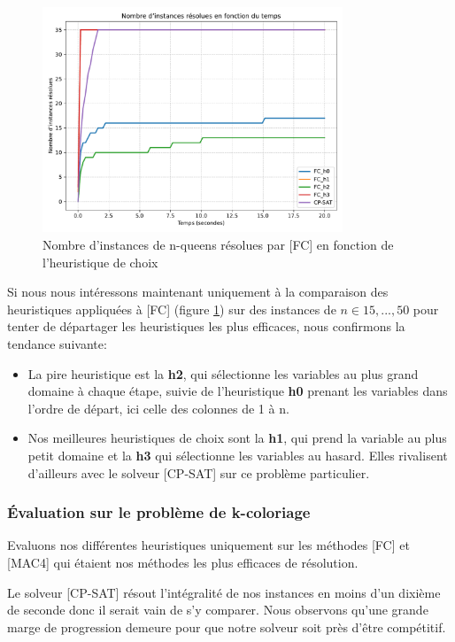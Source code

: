 \documentclass[14pt]{article}
\begin{document}
\begin{figure}[H]
	\centering
	\includegraphics[width=0.8\textwidth]{Images/n-queens-h-FC.pdf}
	\caption{Nombre d'instances de n-queens résolues par [FC] en fonction de l'heuristique de choix}
	\label{fig:n-queens-h2}
\end{figure}

Si nous nous intéressons maintenant uniquement à la comparaison des heuristiques appliquées à [FC] (figure \ref{fig:n-queens-h2}) sur des instances de $n \in 15,...,50$ pour tenter de départager les heuristiques les plus efficaces, nous confirmons la tendance suivante:

\begin{itemize}
	\item La pire heuristique est la \textbf{h2}, qui sélectionne les variables au plus grand domaine à chaque étape, suivie de l'heuristique \textbf{h0} prenant les variables dans l'ordre de départ, ici celle des colonnes de 1 à n.
	\item Nos meilleures heuristiques de choix sont la \textbf{h1}, qui prend la variable au plus petit domaine et la \textbf{h3} qui sélectionne les variables au hasard. Elles rivalisent d'ailleurs avec le solveur [CP-SAT] sur ce problème particulier.
\end{itemize}


\subsubsection{Évaluation sur le problème de k-coloriage}

Evaluons nos différentes heuristiques uniquement sur les méthodes [FC] et [MAC4] qui étaient nos méthodes les plus efficaces de résolution.

Le solveur [CP-SAT] résout l'intégralité de nos instances en moins d'un dixième de seconde donc il serait vain de s'y comparer. Nous observons qu'une grande marge de progression demeure pour que notre solveur soit près d'être compétitif.
\end{document}
